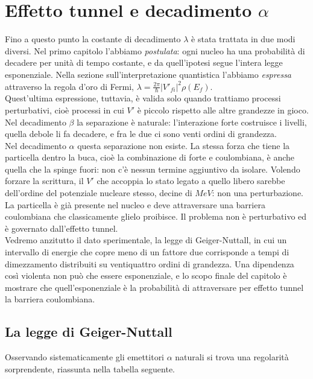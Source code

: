 \chapter{Effetto tunnel e decadimento $\alpha$}

Fino a questo punto la costante di decadimento $\lambda$ è stata trattata in due modi diversi. Nel primo capitolo l'abbiamo \emph{postulata}: ogni nucleo ha una probabilità di decadere per unità di tempo costante, e da quell'ipotesi segue l'intera legge esponenziale. Nella sezione sull'interpretazione quantistica l'abbiamo \emph{espressa} attraverso la regola d'oro di Fermi, $\lambda = \frac{2\pi}{\hbar}|V'_{fi}|^2\rho(E_f)$.\\
Quest'ultima espressione, tuttavia, è valida solo quando trattiamo processi perturbativi, cioè processi in cui $V'$ è piccolo rispetto alle altre grandezze in gioco. Nel decadimento $\beta$ la separazione è naturale: l’interazione forte costruisce i livelli, quella debole li fa decadere, e fra le due ci sono venti ordini di grandezza.\\
Nel decadimento $\alpha$ questa separazione non esiste. La stessa forza che tiene la particella dentro la buca, cioè la combinazione di forte e coulombiana, è anche quella che la spinge fuori: non c’è nessun termine aggiuntivo da isolare. Volendo forzare la scrittura, il $V'$ che accoppia lo stato legato a quello libero sarebbe dell’ordine del potenziale nucleare stesso, decine di $MeV$: non una perturbazione. \\
La particella è già presente nel nucleo e deve attraversare una barriera coulombiana che classicamente glielo proibisce. Il problema non è perturbativo ed è governato dall'effetto tunnel.\\

Vedremo anzitutto il dato sperimentale, la legge di Geiger-Nuttall, in cui un intervallo di energie che copre meno di un fattore due corrisponde a tempi di dimezzamento distribuiti su ventiquattro ordini di grandezza. Una dipendenza così violenta non può che essere esponenziale, e lo scopo finale del capitolo è mostrare che quell'esponenziale è la probabilità di attraversare per effetto tunnel la barriera coulombiana.


\section{La legge di Geiger-Nuttall}

Osservando sistematicamente gli emettitori $\alpha$ naturali si trova una regolarità sorprendente, riassunta nella tabella seguente.

